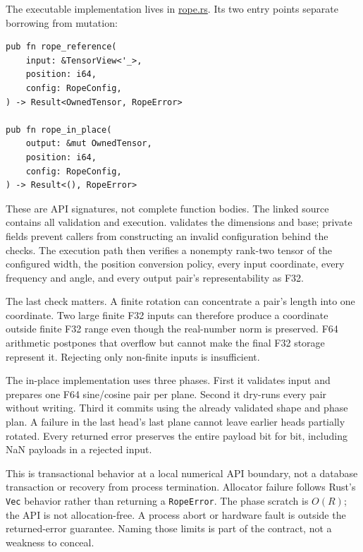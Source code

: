 \documentclass[
  10pt,
]{article}
\newcounter{none} %
\begin{document}
The executable implementation lives in
\href{https://github.com/hermonai/inside-the-llm-engine/blob/astra-visual-rewrite/code/mini-engine/crates/engine0/src/rope.rs}{rope.rs}.
Its two entry points separate borrowing from mutation:

\begin{verbatim}
pub fn rope_reference(
    input: &TensorView<'_>,
    position: i64,
    config: RopeConfig,
) -> Result<OwnedTensor, RopeError>

pub fn rope_in_place(
    output: &mut OwnedTensor,
    position: i64,
    config: RopeConfig,
) -> Result<(), RopeError>
\end{verbatim}

These are API signatures, not complete function bodies. The linked
source contains all validation and execution.
\texttt{} validates the dimensions and
base; private fields prevent callers from constructing an invalid
configuration behind the checks. The execution path then verifies a
nonempty rank-two tensor of the configured width, the position
conversion policy, every input coordinate, every frequency and angle,
and every output pair's representability as F32.

The last check matters. A finite rotation can concentrate a pair's
length into one coordinate. Two large finite F32 inputs can therefore
produce a coordinate outside finite F32 range even though the
real-number norm is preserved. F64 arithmetic postpones that overflow
but cannot make the final F32 storage represent it. Rejecting only
non-finite inputs is insufficient.

The in-place implementation uses three phases. First it validates input
and prepares one F64 sine/cosine pair per plane. Second it dry-runs
every pair without writing. Third it commits using the already validated
shape and phase plan. A failure in the last head's last plane cannot
leave earlier heads partially rotated. Every returned error preserves
the entire payload bit for bit, including NaN payloads in a rejected
input.

This is transactional behavior at a local numerical API boundary, not a
database transaction or recovery from process termination. Allocator
failure follows Rust's \texttt{Vec} behavior rather than returning a
\texttt{RopeError}. The phase scratch is \(O(R)\); the API is not
allocation-free. A process abort or hardware fault is outside the
returned-error guarantee. Naming those limits is part of the contract,
not a weakness to conceal.
\end{document}
